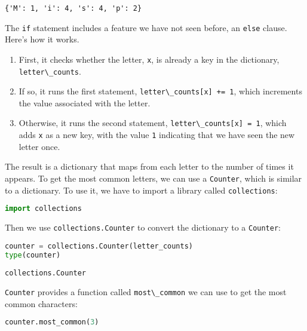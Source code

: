 \begin{lstlisting}[style=output]
{'M': 1, 'i': 4, 's': 4, 'p': 2}
\end{lstlisting}

The \passthrough{\lstinline!if!} statement includes a feature we have
not seen before, an \passthrough{\lstinline!else!} clause. Here's how it
works.

\begin{enumerate}
\def\labelenumi{\arabic{enumi}.}
\item
  First, it checks whether the letter, \passthrough{\lstinline!x!}, is
  already a key in the dictionary,
  \passthrough{\lstinline!letter\_counts!}.
\item
  If so, it runs the first statement,
  \passthrough{\lstinline!letter\_counts[x] += 1!}, which increments the
  value associated with the letter.
\item
  Otherwise, it runs the second statement,
  \passthrough{\lstinline!letter\_counts[x] = 1!}, which adds
  \passthrough{\lstinline!x!} as a new key, with the value
  \passthrough{\lstinline!1!} indicating that we have seen the new
  letter once.
\end{enumerate}

The result is a dictionary that maps from each letter to the number of
times it appears. To get the most common letters, we can use a
\passthrough{\lstinline!Counter!}, which is similar to a dictionary. To
use it, we have to import a library called
\passthrough{\lstinline!collections!}:

\begin{lstlisting}[language=Python,style=source]
import collections
\end{lstlisting}

Then we use \passthrough{\lstinline!collections.Counter!} to convert the
dictionary to a \passthrough{\lstinline!Counter!}:

\begin{lstlisting}[language=Python,style=source]
counter = collections.Counter(letter_counts)
type(counter)
\end{lstlisting}

\begin{lstlisting}[style=output]
collections.Counter
\end{lstlisting}

\passthrough{\lstinline!Counter!} provides a function called
\passthrough{\lstinline!most\_common!} we can use to get the most common
characters:

\begin{lstlisting}[language=Python,style=source]
counter.most_common(3)
\end{lstlisting}

